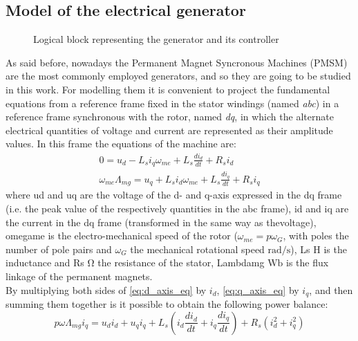\subsection[Electrical generator]{Model of the electrical generator}\label{subsec:electrical_generator_description}
\begin{figure}[htb]
  \centering
  
  \caption{Logical block representing the generator and its controller}
  \label{fig:d_generator_block}
\end{figure}

As said before, nowadays the Permanent Magnet Syncronous Machines (PMSM) are the most commonly employed generators, and so they are going to be studied in this work. For modelling them it is convenient to project the fundamental equations from a reference frame fixed in the stator windings (named \textit{abc}) in a reference frame synchronous with the rotor, named \textit{dq}, in which the alternate electrical quantities of voltage and current are represented as their amplitude values. 
In this frame the equations of the machine are:
\begin{gather}
  0=u_d-L_{s}i_q\omega_{me}+L_{s}\frac{di_d}{dt}+R_{s}i_d 
  \label{eq:d_axis_eq}\\
  \omega_{me}\Lambda_{mg}=u_q+L_{s}i_d\omega_{me}+L_{s}\frac{di_q}{dt}+R_{s}i_q
  \label{eq:q_axis_eq}
\end{gather}
where \acrshort{ud} and \acrshort{uq} are the voltage of the d- and q-axis expressed in the dq frame (i.e. the peak value of the respectively quantities in the abc frame), \acrshort{id} and \acrshort{iq} are the current in the dq frame (transformed in the same way as thevoltage), \acrshort{omegame} is the electro-mechanical speed of the rotor ($\omega_{me}=p\omega_G$, with \acrshort{poles} the number of pole pairs and $\omega_G$ the mechanical rotational speed $\si{\radian \per \second}$), \acrshort{Ls} $\si{\henry}$ is the inductance and \acrshort{Rs} $\si{\ohm}$ the resistance of the stator, \acrshort{Lambdamg} $\si{\weber}$ is the flux linkage of the permanent magnets.\\
By multiplying both sides of \autoref{eq:d_axis_eq} by $i_d$, \autoref{eq:q_axis_eq} by $i_q$, and then summing them together is it possible to obtain the following power balance:
\begin{equation}
  p\omega\Lambda_{mg}i_q=u_di_d + u_qi_q+ L_{s}\left(i_d\frac{di_d}{dt} + i_q\frac{di_q}{dt}\right) + R_{s}(i_d^2 + i_q^2)
  \label{eq:gen_power_balance}
\end{equation}
